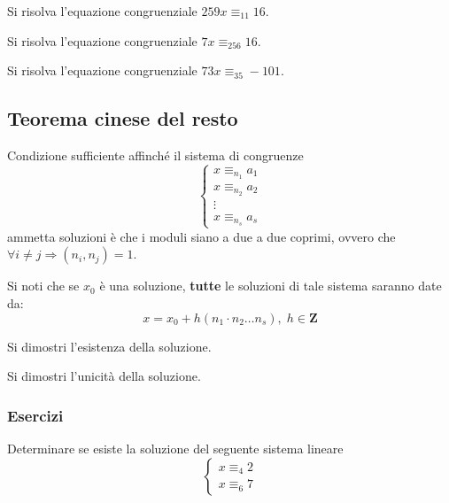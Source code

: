 \begin{flushleft}
\begin{esercizio}
Si risolva l'equazione congruenziale $259x \equiv_{11} 16$.
\end{esercizio}
\vspace{150px}

\begin{esercizio}
Si risolva l'equazione congruenziale $7x \equiv_{256} 16$.
\end{esercizio}
\vspace{150px}


\begin{esercizio}
Si risolva l'equazione congruenziale $73x \equiv_{35} -101$.
\end{esercizio}
\vspace{150px}



\subsection{Teorema cinese del resto}
\begin{theorem}
Condizione sufficiente affinché il sistema di congruenze
\[\begin{cases}
x\equiv_{n_1} a_1\\
x\equiv_{n_2} a_2\\
\vdots\\
x\equiv_{n_s} a_s
\end{cases}
\]
ammetta soluzioni è che i moduli siano a due a due coprimi, ovvero che $\forall i\neq j \Rightarrow (n_i, n_j) = 1$.
\end{theorem}
\begin{osservazione}
Si noti che se $x_0$ è una soluzione, \textbf{tutte} le soluzioni di tale sistema saranno date da:
\[x = x_0 + h (n_1\cdot n_2\hdots n_s),\; h\in \mathbf{Z} \]
\end{osservazione}
\begin{esercizio}
Si dimostri l'esistenza della soluzione.
\end{esercizio}
\vspace{200px}

\begin{esercizio}
Si dimostri l'unicità della soluzione.
\end{esercizio}
\vspace{200px}



\subsubsection{Esercizi}
\begin{esercizio}
Determinare se esiste la soluzione del seguente sistema lineare
\[\begin{cases}
x\equiv_{4} 2\\
x\equiv_{6} 7
\end{cases}
\]
\end{esercizio}
\vspace{200px}



\end{flushleft}
